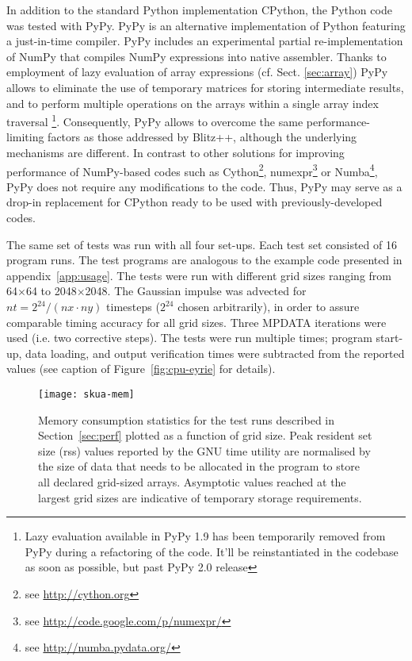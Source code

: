 \documentclass[twocolumn]{article}
\begin{document}
  In addition to the standard Python implementation CPython,
    the Python code was tested with PyPy.
  PyPy is an alternative implementation of Python featuring a just-in-time compiler. 
  PyPy includes an experimental partial re-implementation of NumPy that compiles NumPy expressions into native assembler.
  Thanks to employment of lazy evaluation of array expressions (cf. Sect. \ref{sec:array})
    PyPy allows to eliminate the use of temporary matrices for storing intermediate results,
    and to perform multiple operations on the arrays within a single array index traversal
    \footnote{Lazy evaluation available in PyPy 1.9 has been temporarily removed from PyPy during a refactoring of
      the code. It'll be reinstantiated in the codebase as soon as possible, but past PyPy 2.0 release}.
  Consequently, PyPy allows to overcome the same performance-limiting factors as those addressed by Blitz++, although 
    the underlying mechanisms are different.
  In contrast to other solutions for improving performance of NumPy-based codes such as
    Cython\footnote{see \url{http://cython.org}}, 
    numexpr\footnote{see \url{http://code.google.com/p/numexpr/}} or 
    Numba\footnote{see \url{http://numba.pydata.org/}}, 
    PyPy does not require any modifications to the code.
  Thus, PyPy may serve as a drop-in replacement for CPython ready to be used with 
    previously-developed codes.
  
  The same set of tests was run with all four set-ups.
  Each test set consisted of 16 program runs.
  The test programs are analogous to the example code presented in appendix~\ref{app:usage}.
  The tests were run with different grid sizes ranging from 64$\times$64 to 2048$\times$2048.
  The Gaussian impulse was advected for $nt=2^{24}/(nx\cdot ny)$ timesteps ($2^{24}$ chosen arbitrarily), 
    in order to assure comparable timing accuracy for all grid sizes.
  Three MPDATA iterations were used (i.e. two corrective steps).
  The tests were run multiple times; program start-up, data loading, and output verification times were
    subtracted from the reported values (see caption of Figure~\ref{fig:cpu-eyrie} for details).

  \begin{figure}[h!]
    \center
    \texttt{[image: skua-mem]}
    \caption{\label{fig:mem}
      Memory consumption statistics for the test runs described in Section~\ref{sec:perf}
        plotted as a function of grid size.
      Peak resident set size (rss) values reported by the GNU time utility are normalised by the size of
        data that needs to be allocated in the program to store all declared grid-sized arrays.
      Asymptotic values reached at the largest grid sizes are indicative 
        of temporary storage requirements.
    }
  \end{figure}
 
\end{document}
